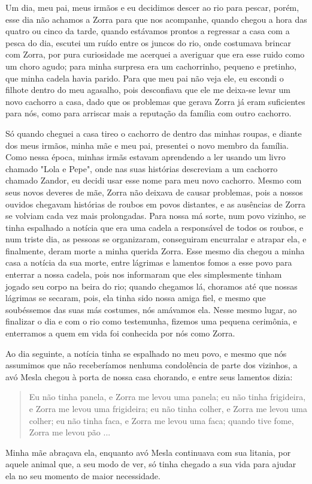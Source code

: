 Um dia, meu pai, meus irmãos e eu decidimos descer ao rio para pescar, porém, esse dia não achamos a Zorra para que nos acompanhe, quando chegou a hora das quatro ou cinco da tarde, quando estávamos prontos a regressar a casa com a pesca do dia, escutei um ruído entre os juncos do rio, onde costumava brincar com Zorra, por pura curiosidade me acerquei a averiguar que era esse ruido como um choro agudo; para minha surpresa era um cachorrinho, pequeno e pretinho, que minha cadela havia parido.  
Para que meu pai não veja ele, eu escondi o filhote dentro do meu agasalho, pois desconfiava que ele me deixa-se levar um novo cachorro a casa, dado que os problemas que gerava Zorra já eram suficientes para nós, como para arriscar mais a reputação da família com outro cachorro.

Só quando cheguei a casa tireo o cachorro de dentro das minhas roupas, e diante dos meus irmãos, minha mãe e meu pai, presentei o novo membro da família. Como nessa época, minhas irmãs estavam aprendendo a ler usando um livro chamado "Lola e Pepe", onde nas suas histórias descreviam a um cachorro chamado Zandor, eu decidi usar esse nome para meu novo cachorro. 
Mesmo com seus novos deveres de mãe, Zorra não deixava de causar problemas, pois a nossos ouvidos chegavam histórias de roubos em povos distantes, e as ausências de Zorra se volviam cada vez mais prolongadas.
Para nossa má sorte, num povo vizinho, se tinha espalhado a notícia que era uma cadela a responsável de todos os roubos, e num triste dia, as pessoas se organizaram, conseguiram encurralar e atrapar ela, e finalmente, deram morte a minha querida Zorra.
Esse mesmo dia chegou a minha casa a notícia da sua morte, entre lágrimas e lamentos fomos a esse povo para enterrar a nossa cadela, pois nos informaram que eles simplesmente tinham jogado seu corpo na beira do rio; quando chegamos lá, choramos até que nossas lágrimas se secaram, pois, ela tinha sido nossa amiga fiel, e mesmo que soubéssemos das suas más costumes, nós amávamos ela.
Nesse mesmo lugar, ao finalizar o dia e com o rio como testemunha, fizemos uma pequena cerimônia, e enterramos a quem em vida foi conhecida por nós como Zorra.

Ao dia seguinte, a notícia tinha se espalhado no meu povo, e mesmo que nós assumimos que não receberíamos nenhuma condolência de parte dos vizinhos, a avó Mesla chegou à porta de nossa casa chorando, e entre seus lamentos dizia:
\begin{quotation}
Eu não tinha panela, e Zorra me levou uma panela; 
eu não tinha frigideira, e Zorra me levou uma frigideira; 
eu não tinha colher, e Zorra me levou uma colher;
eu não tinha faca, e Zorra me levou uma faca;
quando tive fome, Zorra me levou pão ...  
\end{quotation}
Minha mãe abraçava ela, enquanto avó Mesla continuava com sua litania, por aquele animal que, a seu modo de ver, só tinha chegado a sua vida para ajudar ela no seu momento de maior necessidade.
 

